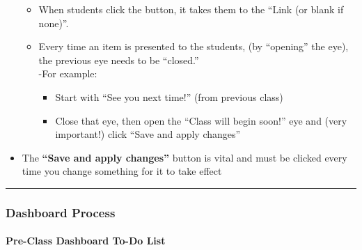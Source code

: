 \documentclass[
]{article}
\providecommand{\tightlist}{%
  \setlength{\itemsep}{0pt}\setlength{\parskip}{0pt}}
\begin{document}
\begin{itemize}
  \begin{itemize}
  \tightlist
  \item
    When students click the button, it takes them to the ``Link (or blank if none)''.
  \item
    Every time an item is presented to the students, (by ``opening'' the eye), the previous eye needs to be ``closed.''\\
    -For example:

    \begin{itemize}
    \tightlist
    \item
      Start with ``See you next time!'' (from previous class)
    \item
      Close that eye, then open the ``Class will begin soon!'' eye and (very important!) click ``Save and apply changes''
    \end{itemize}
  \end{itemize}
\item
  The \textbf{``Save and apply changes''} button is vital and must be clicked every time you change something for it to take effect
\end{itemize}

\begin{center}\rule{0.5\linewidth}{0.5pt}\end{center}

\hypertarget{dashboard-process}{%
\subsubsection{Dashboard Process}\label{dashboard-process}}

\hypertarget{pre-class-dashboard-to-do-list}{%
\paragraph{Pre-Class Dashboard To-Do List}\label{pre-class-dashboard-to-do-list}}
\end{document}
